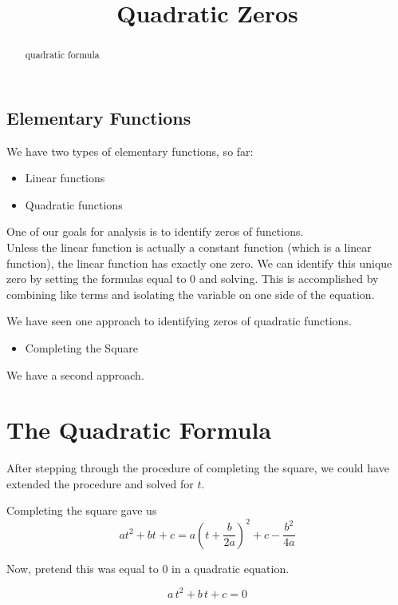 \documentclass{ximera}
\title{Quadratic Zeros}
\begin{document}
\begin{abstract}
quadratic formula
\end{abstract}
\maketitle



\subsection{Elementary Functions}

We have two types of elementary functions, so far:

\begin{itemize}
\item Linear functions
\item Quadratic functions
\end{itemize}

One of our goals for analysis is to identify zeros of functions. \\

Unless the linear function is actually a constant function (which is a linear function), the linear function has exactly one zero. We can identify this unique zero by setting the formulas equal to $0$ and solving.  This is accomplished by combining like terms and isolating the variable on one side of the equation.

We have seen one approach to identifying zeros of quadratic functions.
\begin{itemize}
\item Completing the Square
\end{itemize}

We have a second approach. \\




\section{The Quadratic Formula}


After stepping through the procedure of completing the square, we could have extended the procedure and solved for $t$.


Completing the square gave us 
\[ a t^2 + b t + c = a \left(t + \frac{b}{2 a} \right)^2 + c - \frac{b^2}{4 a} \]


Now, pretend this was equal to $0$ in a quadratic equation.


\[ a \, t^2 + b \, t + c = 0 \]
\end{document}
